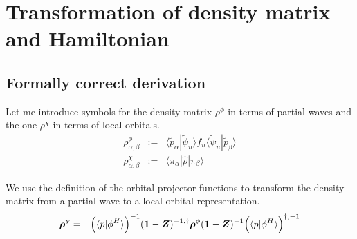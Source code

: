 \documentclass[11pt,a4paper]{report}
\begin{document}
\section{Transformation of density matrix and Hamiltonian}
\subsection{Formally correct derivation}
Let me introduce symbols for the density matrix $\rho^\phi$ in terms
of partial waves and the one $\rho^\chi$ in terms of local orbitals.
\begin{eqnarray}
\rho^\phi_{\alpha,\beta}&:=&\langle\tilde{p}_\alpha|\tilde{\psi}_n\rangle
f_n\langle\tilde{\psi}_n|\tilde{p}_\beta\rangle
\nonumber\\
\rho^\chi_{\alpha,\beta}&:=&\langle\pi_\alpha|\hat{\rho}|\pi_\beta\rangle
\end{eqnarray}

We use the definition of the orbital projector functions
 to transform the density
matrix from a partial-wave to a local-orbital representation.
\begin{eqnarray}
\bm{\rho}^\chi&=&\Bigl(\langle{p}|\phi^H\rangle\Bigr)^{-1}
(\bm{1}-\bm{Z})^{-1,\dagger}
\bm{\rho}^\phi
(\bm{1}-\bm{Z})^{-1}
\Bigl(\langle{p}|\phi^H\rangle\Bigr)^{\dagger,-1}
\end{eqnarray}
\end{document}
